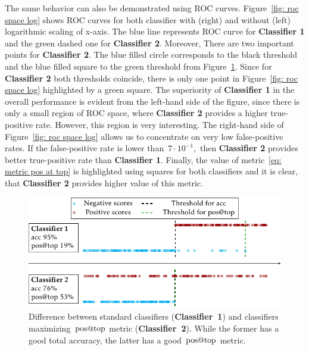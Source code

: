 The same behavior can also be demonstrated using ROC curves. Figure~\ref{fig: roc space log} shows ROC curves for both classifier with (right) and without (left) logarithmic scaling of x-axis. The blue line represents ROC curve for \textbf{Classifier 1} and the green dashed one for \textbf{Classifier 2}. Moreover, There are two important points for \textbf{Classifier 2}. The blue filled circle corresponds to the black threshold and the blue filled square to the green threshold from Figure~\ref{fig: standard vs. aatp}. Since for \textbf{Classifier 2} both thresholds coincide, there is only one point in Figure~\ref{fig: roc space log} highlighted by a green square. The superiority of \textbf{Classifier 1} in the overall performance is evident from the left-hand side of the figure, since there is only a small region of ROC space, where \textbf{Classifier 2} provides a higher true-positive rate. However, this region is very interesting. The right-hand side of Figure~\ref{fig: roc space log} allows us to concentrate on very low false-positive rates. 
If the false-positive rate is lower than~$7 \cdot 10^{-1},$ then \textbf{Classifier 2} provides better true-positive rate than \textbf{Classifier 1}. Finally, the value of metric~\eqref{eq: metric pos at top} is highlighted using squares for both classifiers and it is clear, that \textbf{Classifier 2} provides higher value of this metric.

\begin{figure}
  \centering
  \includegraphics{images/standard_aatp_comparison.pdf}
  \caption{Difference between standard classifiers (\textbf{Classifier~1}) and classifiers maximizing~$\operatorname{pos@top}$ metric (\textbf{Classifier~2}). While the former has a good total accuracy, the latter has a good~$\operatorname{pos@top}$ metric.}
  \label{fig: standard vs. aatp}
\end{figure}

